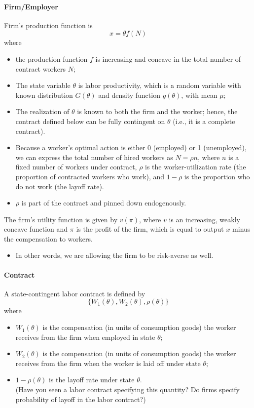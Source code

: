 \documentclass[12pt]{article}
\begin{document}
 \paragraph{Firm/Employer \\ [6pt]}
	Firm's production function is 
	\begin{equation}
		x = \theta f(N)
	\end{equation}
where 
\begin{itemize}
		\item the production function $f$ is increasing and concave in the total number of contract workers $N$;
	\item The state variable $\theta$ is labor productivity, which is a random variable with known distribution $G(\theta)$ and density function $g(\theta)$, with mean $\mu$;
		\item The realization of $\theta$ is known to both the firm and the worker; hence, the contract defined below can be fully contingent on $\theta$ (i.e., it is a complete contract).
		\item Because a worker's optimal action is either 0 (employed) or 1 (unemployed), we can express the total number of hired workers as $N = \rho n$, where $n$ is a fixed number of workers under contract, $\rho$ is the worker-utilization rate (the proportion of contracted workers who work), and $1-\rho$ is the proportion who do not work (the layoff rate). 
	\item $\rho$ is part of the contract and pinned down endogenously. 
\end{itemize}

The firm's utility function is given by $v(\pi)$, where $v$ is an increasing, weakly concave function and $\pi$ is the profit of the firm, which is equal to output $x$ minus the compensation to workers.
\begin{itemize}
	\item In other words, we are allowing the firm to be risk-averse as well.
\end{itemize}

\paragraph{Contract  \\ [6pt]}
A state-contingent labor contract is defined by
\begin{equation}
	\{W_1(\theta), W_2(\theta), \rho(\theta)\}
\end{equation}
where
\begin{itemize}
		\item $W_1(\theta)$ is the compensation (in units of consumption goods) the worker receives from the firm when employed in state $\theta$;
	\item $W_2(\theta)$ is the compensation (in units of consumption goods) the worker receives from the firm when the worker is laid off under state $\theta$;
	\item $1 - \rho (\theta)$ is the layoff rate under state $\theta$. \\
	(Have you seen a labor contract specifying this quantity? Do firms specify probability of layoff in the labor contract?)
\end{itemize}
\end{document}
